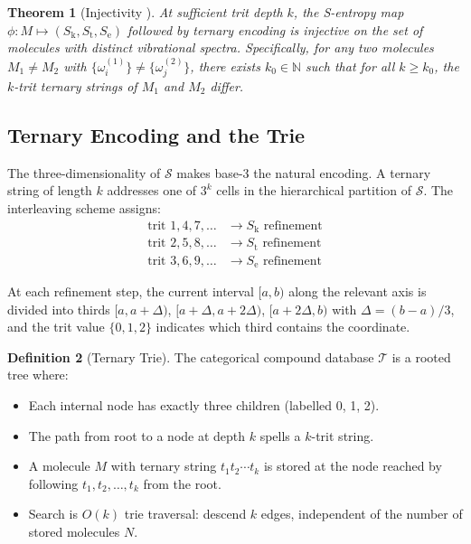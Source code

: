 \documentclass[11pt,twocolumn,a4paper]{article}
\newtheorem{theorem}{Theorem}[section]
\theoremstyle{definition}
\newtheorem{definition}[theorem]{Definition}
\theoremstyle{remark}
\newcommand{\Sk}{S_{\mathrm{k}}}
\newcommand{\St}{S_{\mathrm{t}}}
\newcommand{\Se}{S_{\mathrm{e}}}
\newcommand{\Sspace}{\mathcal{S}}
\newcommand{\Natural}{\mathbb{N}}
\newcommand{\Trie}{\mathcal{T}}
\begin{document}
\begin{theorem}[Injectivity {\citep[Theorem~5.1]{sachikonye2025c}}]
\label{thm:injectivity}
At sufficient trit depth $k$, the S-entropy map $\phi: M \mapsto (\Sk, \St, \Se)$ followed by ternary encoding is injective on the set of molecules with distinct vibrational spectra. Specifically, for any two molecules $M_1 \neq M_2$ with $\{\omega_i^{(1)}\} \neq \{\omega_j^{(2)}\}$, there exists $k_0 \in \Natural$ such that for all $k \geq k_0$, the $k$-trit ternary strings of $M_1$ and $M_2$ differ.
\end{theorem}

\subsection{Ternary Encoding and the Trie}

The three-dimensionality of $\Sspace$ makes base-3 the natural encoding. A ternary string of length $k$ addresses one of $3^k$ cells in the hierarchical partition of $\Sspace$. The interleaving scheme assigns:
\begin{align}
\text{trit } 1, 4, 7, \ldots &\to \Sk \text{ refinement} \\
\text{trit } 2, 5, 8, \ldots &\to \St \text{ refinement} \\
\text{trit } 3, 6, 9, \ldots &\to \Se \text{ refinement}
\end{align}

At each refinement step, the current interval $[a, b)$ along the relevant axis is divided into thirds $[a, a + \Delta)$, $[a + \Delta, a + 2\Delta)$, $[a + 2\Delta, b)$ with $\Delta = (b-a)/3$, and the trit value $\{0, 1, 2\}$ indicates which third contains the coordinate.

\begin{definition}[Ternary Trie]
\label{def:trie}
The categorical compound database $\Trie$ is a rooted tree where:
\begin{itemize}[nosep]
\item Each internal node has exactly three children (labelled 0, 1, 2).
\item The path from root to a node at depth $k$ spells a $k$-trit string.
\item A molecule $M$ with ternary string $t_1 t_2 \cdots t_k$ is stored at the node reached by following $t_1, t_2, \ldots, t_k$ from the root.
\item Search is $O(k)$ trie traversal: descend $k$ edges, independent of the number of stored molecules $N$.
\end{itemize}
\end{definition}
\end{document}
